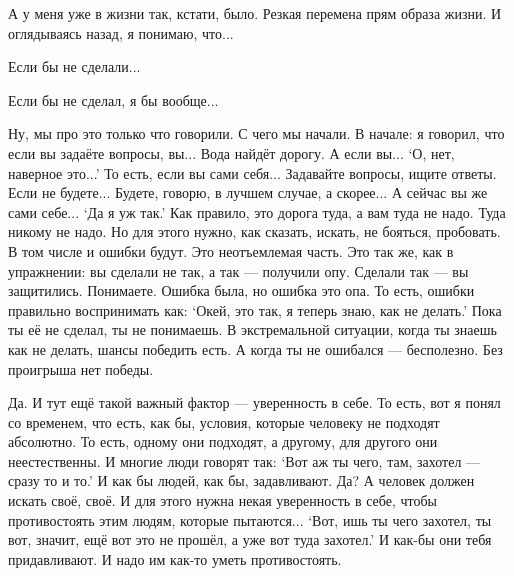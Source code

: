 \I
А у меня уже в жизни так, кстати, было.
Резкая перемена прям образа жизни. И оглядываясь назад, я понимаю, что...

\A
Если бы не сделали...

\I
Если бы не сделал, я бы вообще...

\A
Ну, мы про это только что говорили.
С чего мы начали.
В начале: я говорил, что если вы задаёте вопросы, вы...
Вода найдёт дорогу.
А если вы...
`О, нет, наверное это...'
То есть, если вы сами себя... Задавайте вопросы, ищите ответы.
Если не будете... Будете, говорю, в лучшем случае, а скорее...
А сейчас вы же сами себе... `Да я уж так.' Как правило, это дорога туда, а вам туда не надо.
Туда никому не надо.
Но для этого нужно, как сказать, искать, не бояться, пробовать.
В том числе и ошибки будут.
Это неотъемлемая часть.
Это так же, как в упражнении:
вы сделали не так, а так --- получили опу.
Сделали так --- вы защитились.
Понимаете.
Ошибка была, но ошибка это опа.
То есть, ошибки правильно воспринимать как:
`Окей, это так, я теперь знаю, как не делать.'
Пока ты её не сделал, ты не понимаешь.
В экстремальной ситуации, когда ты знаешь как не делать, шансы победить есть.
А когда ты не ошибался --- бесполезно.
Без проигрыша нет победы.

\I
Да. И тут ещё такой важный фактор --- уверенность в себе.
То есть, вот я понял со временем, что есть, как бы, условия, которые человеку не
подходят абсолютно.
То есть, одному они подходят, а другому, для другого они неестественны.
И многие люди говорят так: `Вот аж ты чего, там, захотел --- сразу то и то.'
И как бы людей, как бы, задавливают. Да?
А человек должен искать своё, своё.
И для этого нужна некая уверенность в себе, чтобы
противостоять этим людям, которые пытаются... `Вот, ишь ты чего захотел, ты вот, значит,
ещё вот это не прошёл, а уже вот туда захотел.' И как-бы они тебя придавливают.
И надо им как-то уметь противостоять.

